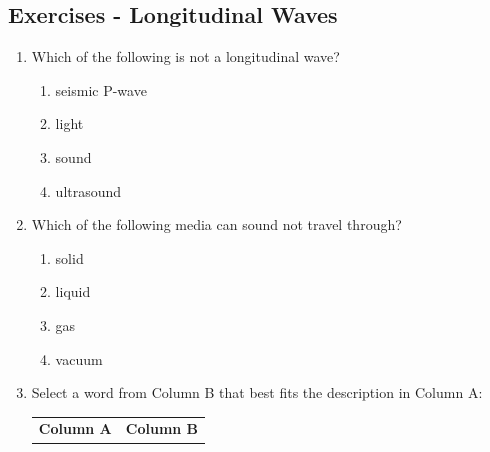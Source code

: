             \subsection{ Exercises - Longitudinal Waves}
            \nopagebreak
      \label{m38783*id293753}\begin{enumerate}[noitemsep, label=\textbf{\arabic*}. ] 
            \label{m38783*uid27}\item Which of the following is not a longitudinal wave?
\label{m38783*id293768}\begin{enumerate}[noitemsep, label=\textbf{\alph*}. ] 
            \label{m38783*uid28}\item seismic P-wave
\label{m38783*uid29}\item light
\label{m38783*uid30}\item sound
\label{m38783*uid31}\item ultrasound
\end{enumerate}
                \label{m38783*uid32}\item Which of the following media can sound not travel through?
\label{m38783*id293834}\begin{enumerate}[noitemsep, label=\textbf{\alph*}. ] 
            \label{m38783*uid33}\item solid
\label{m38783*uid34}\item liquid
\label{m38783*uid35}\item gas
\label{m38783*uid36}\item vacuum
\end{enumerate}
                \label{m38783*uid37}\item Select a word from Column B that best fits the description in Column A:
          \begin{table}[H]
        \begin{center}
      \label{m38783*id293899}
    \noindent
      \tablelasttail{}
      \begin{xtabular}[t]{|l|l|}\hline
        \textbf{Column A} &
        \textbf{Column B}%
     \tabularnewline{}

\end{xtabular}
\end{center}
\end{table}
\end{enumerate}
